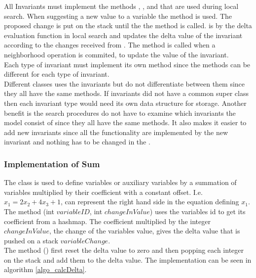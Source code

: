 All Invariants must implement the methods , , and 
 that are used during local search. When suggesting a new 
value to a variable the method  is used. The proposed change is put on the stack until the 
the method  is called.  is by the delta evaluation function in local 
search and updates the delta value of the invariant according to the changes received from . The 
method  is called when a neighborhood operation is commited, to update the value of the invariant. 
\\ Each type of invariant must implement its own method since the methods can be different for each type of invariant. 
\\ 
Different classes uses the invariants but do not differentiate between them since they all have the same methods.  
If invariants did not have a common super class then each invariant type would need its own data structure for 
storage. Another benefit is the search procedures do not have to examine which invariants the model consist of since 
they all have the same methods. It also makes it easier to add new invariants since all the functionality are 
implemented by the new invariant and nothing has to be changed in the . \\ 
\subsubsection{Implementation of Sum}
The class  is used to define variables or auxiliary variables by a summation of variables multiplied by 
their coefficient with a constant offset. I.e. $x_1 = 2x_2+4x_3 + 1$,  can represent the right hand side in 
the equation defining $x_1$. \\ 
The method (int  $variableID$, int $changeInValue$) uses the variables id to 
get its coefficient from a hashmap. The coefficient multiplied by the integer $changeInValue$, the change of the 
variables value, gives the delta value that is pushed on a stack $variableChange$. \\ 
The method () first reset the delta value to zero and then popping each integer on the stack 
and add them to the delta value. The implementation can be seen in algorithm \ref{algo_calcDelta}. 

